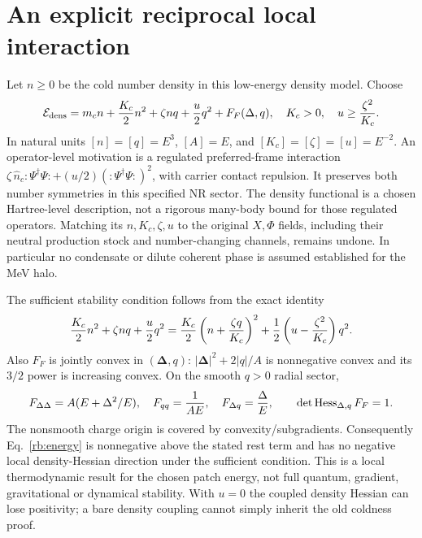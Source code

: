 \documentclass[11pt]{article}
\begin{document}
\section{An explicit reciprocal local interaction}
Let $n\geq0$ be the cold number density in this low-energy density model.
Choose
\begin{equation}
 \mathcal E_{\rm dens}=m_cn+{K_c\over2}n^2
       +\zeta nq+{u\over2}q^2+F_F(\Delta,q),
 \quad K_c>0,\quad u\geq{\zeta^2\over K_c}.
 \label{rb:energy}
\end{equation}
In natural units $[n]=[q]=E^3$, $[A]=E$, and
$[K_c]=[\zeta]=[u]=E^{-2}$. An operator-level motivation is a regulated
preferred-frame interaction
$\zeta\,\hat n_c:\!\Psi^\dagger\Psi\!:
+(u/2)(:\!\Psi^\dagger\Psi\!:)^2$, with carrier contact repulsion.
It preserves both number symmetries in this specified NR sector. The
density functional is a chosen Hartree-level description, not a rigorous
many-body bound for those regulated operators. Matching its $n,K_c,\zeta,u$
to the original $X,\Phi$ fields, including their neutral production stock
and number-changing channels, remains undone. In particular no condensate
or dilute coherent phase is assumed established for the MeV halo.

The sufficient stability condition follows from the exact identity
\begin{equation}
 {K_c\over2}n^2+\zeta nq+{u\over2}q^2
 ={K_c\over2}\left(n+{\zeta q\over K_c}\right)^2
  +{1\over2}\left(u-{\zeta^2\over K_c}\right)q^2.
 \label{rb:square}
\end{equation}
Also $F_F$ is jointly convex in $(\boldsymbol\Delta,q)$:
$|\boldsymbol\Delta|^2+2|q|/A$ is nonnegative convex and its $3/2$
power is increasing convex. On the smooth $q>0$ radial sector,
\begin{equation}
 F_{\Delta\Delta}=A(E+\Delta^2/E),\quad
 F_{qq}={1\over AE},\quad F_{\Delta q}={\Delta\over E},
 \qquad \det\operatorname{Hess}_{\Delta,q}F_F=1.
\end{equation}
The nonsmooth charge origin is covered by convexity/subgradients.
Consequently Eq.~\eqref{rb:energy} is nonnegative above the stated rest
term and has no negative local density-Hessian direction under the
sufficient condition. This is a local thermodynamic result for the
chosen patch energy, not full quantum, gradient, gravitational or dynamical
stability. With $u=0$ the coupled density Hessian can lose positivity;
a bare density coupling cannot simply inherit the old coldness proof.
\end{document}
